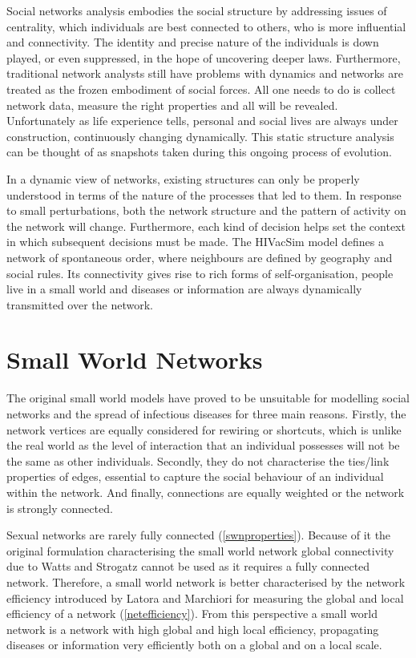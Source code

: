 Social networks analysis embodies the social structure by addressing issues of
centrality, which individuals are best connected to others, who is more influential and
connectivity. The identity and precise nature of the individuals is down played, or even
suppressed, in the hope of uncovering deeper laws. Furthermore, traditional network
analysts still have problems with dynamics and networks are treated as the frozen
embodiment of social forces. All one needs to do is collect network data, measure the
right properties and all will be revealed. Unfortunately as life experience tells,
personal and social lives are always under construction, continuously changing
dynamically. This static structure analysis can be thought of as snapshots taken during
this ongoing process of evolution.

In a dynamic view of networks, existing structures can only be properly understood in
terms of the nature of the processes that led to them. In response to small
perturbations, both the network structure and the pattern of activity on the network will
change. Furthermore, each kind of decision helps set the context in which subsequent
decisions must be made. The HIVacSim model defines a network of spontaneous order, where
neighbours are defined by geography and social rules. Its connectivity gives rise to rich
forms of self-organisation, people live in a small world and diseases or information are
always dynamically transmitted over the network.

\section{Small World Networks}

The original small world models \cite{Watts1998,Newman1999} have proved to be unsuitable
for modelling social networks and the spread of infectious diseases for three main
reasons. Firstly, the network vertices are equally considered for rewiring or shortcuts,
which is unlike the real world as the level of interaction that an individual possesses
will not be the same as other individuals. Secondly, they do not characterise the
ties/link properties of edges, essential to capture the social behaviour of an individual
within the network. And finally, connections are equally weighted or the network is
strongly connected.

Sexual networks are rarely fully connected (\ref{swnproperties}). Because of it the
original formulation characterising the small world network global connectivity due to
Watts and Strogatz \cite{Watts1998} cannot be used as it requires a fully connected
network. Therefore, a small world network is better characterised by the network
efficiency introduced by Latora and Marchiori \cite{Latora2001} for measuring the global
and local efficiency of a network (\ref{netefficiency}). From this perspective a small
world network is a network with high global and high local efficiency, propagating
diseases or information very efficiently both on a global and on a local scale.

